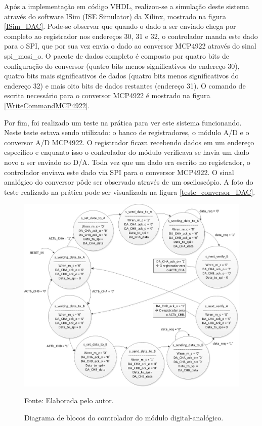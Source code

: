 Após a implementação em código VHDL, realizou-se a simulação deste sistema através do software ISim (ISE Simulator) da Xilinx, mostrado na figura \ref{ISim_DAC}. Pode-se observar que quando o dado a ser enviado chega por completo ao registrador nos endereços 30, 31 e 32, o controlador manda este dado para o SPI, que por sua vez envia o dado ao conversor MCP4922 através do sinal spi\_mosi\_o. O pacote de dados completo é composto por quatro bits de configuração do conversor (quatro bits menos significativos do endereço 30), quatro bits mais significativos de dados (quatro bits menos significativos do endereço 32) e mais oito bits de dados restantes (endereço 31). O comando de escrita necessário para o conversor MCP4922 é mostrado na figura \ref{WriteCommandMCP4922}.

Por fim, foi realizado um teste na prática para ver este sistema funcionando. Neste teste estava sendo utilizado: o banco de registradores, o módulo A/D e o conversor A/D MCP4922. O registrador ficava recebendo dados em um endereço específico e enquanto isso o controlador do módulo verificava se havia um dado novo a ser enviado ao D/A. Toda vez que um dado era escrito no registrador, o controlador enviava este dado via SPI para o conversor MCP4922. O sinal analógico do conversor pôde ser observado através de um osciloscópio. A foto do teste realizado na prática pode ser visualizada na figura \ref{teste_conversor_DAC}.

\begin{figure}[!htb]
	\centering
	\caption{Diagrama de blocos do controlador do módulo digital-analógico.}
	\includegraphics[scale = .9]{Imagens/controlador_DAC}
	
	Fonte: Elaborada pelo autor.
	
	\label{controlador_DAC}
\end{figure}

